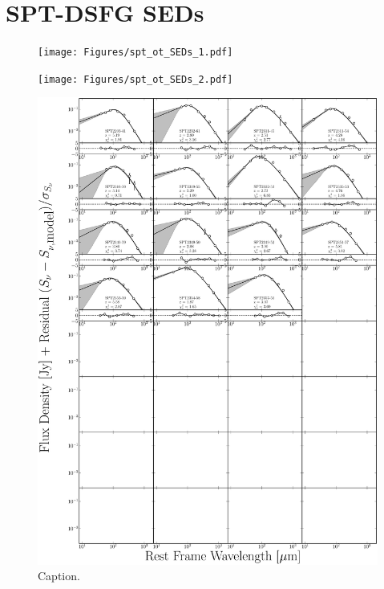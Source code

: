 \chapter{SPT-DSFG SEDs}

\begin{figure}
	\centering
	\texttt{[image: Figures/spt\_ot\_SEDs\_1.pdf]}
\end{figure}
\begin{figure}
	\centering
	\texttt{[image: Figures/spt\_ot\_SEDs\_2.pdf]}
\end{figure}
\begin{figure}
	\centering
	\includegraphics[width=\columnwidth]{Figures/spt_ot_SEDs_3.pdf}
	\caption[Caption]{Caption.}
\end{figure}


